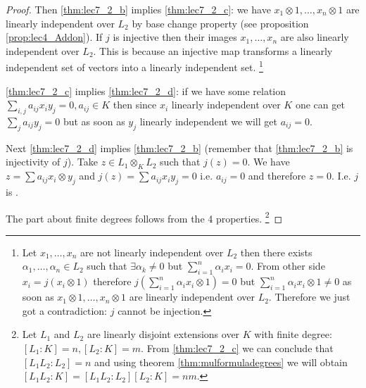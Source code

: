 \begin{theorem}
\begin{proof}
    Then \ref{thm:lec7_2_b} implies \ref{thm:lec7_2_c}: we have
    $x_1 \otimes 1, \dots, x_n \otimes 1$ are linearly independent
    over $L_2$ by base change property
    (see proposition \ref{prop:lec4_Addon}).
    If $j$ is injective then their images $x_1, \dots, x_n$
    are also linearly independent over $L_2$. This is because an
    injective map transforms a linearly independent set of vectors
    into a linearly independent set.
    \footnote{
      Let $x_1, \dots, x_n$ are not linearly independent over $L_2$
      then there exists $\alpha_1, \dots, \alpha_n \in L_2$ such that
      $\exists \alpha_k \ne 0$ but $\sum_{i=1}^n \alpha_i x_i =
      0$. From other side $x_i = j\left(x_i \otimes 1\right)$
      therefore $j\left(\sum_{i=1}^n \alpha_i x_i \otimes 1 \right) =
      0$ but $\sum_{i=1}^n \alpha_i x_i \otimes 1 \ne 0$ as soon as
      $x_1 \otimes 1, \dots, x_n \otimes 1$ are linearly independent
      over $L_2$. Therefore we just got a contradiction: $j$ cannot be
      injection. 
    }

    \ref{thm:lec7_2_c} implies \ref{thm:lec7_2_d}: if we have some
    relation $\sum_{i,j} a_{ij} x_i y_j = 0, a_{ij} \in K$ then since $x_i$
    linearly independent over $K$ one can get $\sum_{j} a_{ij} y_j = 0$
    but as soon as $y_j$ linearly independent we will get $a_{ij} =
    0$.

    Next \ref{thm:lec7_2_d} implies \ref{thm:lec7_2_b} (remember that
    \ref{thm:lec7_2_b} is injectivity of $j$). Take
    $z \in L_1 \otimes_K L_2$ such that $j\left(z\right) = 0$. We have
    $z = \sum a_{ij} x_i \otimes y_j$ and
    $j\left(z\right) = \sum a_{ij} x_i y_j = 0$ i.e. $a_{ij} = 0$ and
    therefore $z = 0$. I.e. $j$ is .

    The part about finite degrees follows from the 4 properties.
    \footnote{
      Let $L_1$ and $L_2$ are linearly disjoint extensions over $K$
      with finite degree: $\left[L_1:K\right] = n, \left[L_2:K\right]
      = m$. From \ref{thm:lec7_2_c} we can conclude that
      $\left[L_1 L_2:L_2\right] = n$ and using theorem
      \ref{thm:mulformuladegrees} we will obtain 
      $\left[L_1 L_2:K\right] = \left[L_1 L_2:L_2\right]
      \left[L_2 : K\right] = nm$.
    }
  \end{proof}
\end{theorem}

